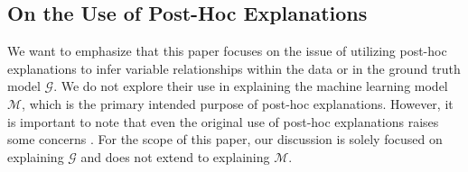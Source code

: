 \documentclass[mnsc,blindrev]{informs3}
\begin{document}

    
    
    \subsection{On the Use of Post-Hoc Explanations}
    We want to emphasize that this paper focuses on the issue of utilizing post-hoc explanations to infer variable relationships within the data or in the ground truth model $\mathcal{G}$. We do not explore their use in explaining the machine learning model $\mathcal{M}$, which is the primary intended purpose of post-hoc explanations. However, it is important to note that even the original use of post-hoc explanations raises some concerns \cite{garreau2020looking,alvarez18robustness,kumar20shap,jacovi2023diagnosing}. For the scope of this paper, our discussion is solely focused on explaining $\mathcal{G}$ and does not extend to explaining $\mathcal{M}$.
    
\end{document}

